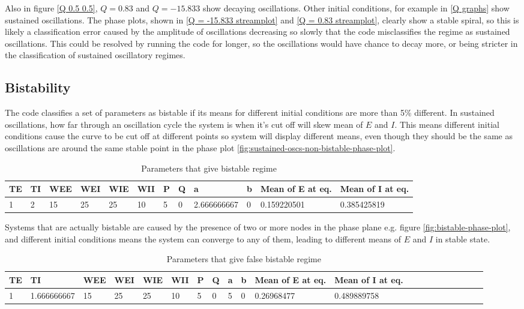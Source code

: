 \documentclass[10pt]{article}
\begin{document}
\begin{flushleft}
Also in figure \ref{Q 0.5 0.5}, $Q = 0.83$ and $Q = -15.833$ show decaying oscillations. Other initial conditions, for example in \ref{Q graphs} show sustained oscillations. The phase plots, shown in \ref{Q = -15.833 streamplot} and \ref{Q = 0.83 streamplot}, clearly show a stable spiral, so this is likely a classification error caused by the amplitude of oscillations decreasing so slowly that the code misclassifies the regime as sustained oscillations. This could be resolved by running the code for longer, so the oscillations would have chance to decay more, or being stricter in the classification of sustained oscillatory regimes.

\subsection{Bistability}

The code classifies a set of parameters as bistable if its means for different initial conditions are more than 5\% different. In sustained oscillations, how far through an oscillation cycle the system is when it's cut off will skew mean of $E$ and $I$. This means different initial conditions cause the curve to be cut off at different points so system will display different means, even though they should be the same as oscillations are around the same stable point in the phase plot \ref{fig:sustained-oscs-non-bistable-phase-plot}.

\begin{table}[!ht]
    \centering
    \begin{tabular}{|l|l|l|l|l|l|l|l|l|l|l|l|}
    \hline
        TE & TI & WEE & WEI & WIE & WII & P & Q & a & b & Mean of E at eq. & Mean of I at eq. \\ \hline
        1 & 2 & 15 & 25 & 25 & 10 & 5 & 0 & 2.666666667 & 0 & 0.159220501 & 0.385425819 \\ \hline
    \end{tabular}
    \caption{Parameters that give bistable regime}
\end{table}

Systems that are actually bistable are caused by the presence of two or more nodes in the phase plane e.g. figure \ref{fig:bistable-phase-plot}, and different initial conditions means the system can converge to any of them, leading to different means of $E$ and $I$ in stable state.

\begin{table}[!ht]
    \centering
    \begin{tabular}{|l|l|l|l|l|l|l|l|l|l|l|l|l|l|l|l|l|l|l|l|l|}
    \hline
        TE & TI & WEE & WEI & WIE & WII & P & Q & a & b & Mean of E at eq. & Mean of I at eq. \\ \hline
        1 & 1.666666667 & 15 & 25 & 25 & 10 & 5 & 0 & 5 & 0 & 0.26968477 & 0.489889758 \\ \hline
    \end{tabular}
    \caption{Parameters that give false bistable regime}
\end{table}


\end{flushleft}
\end{document}
